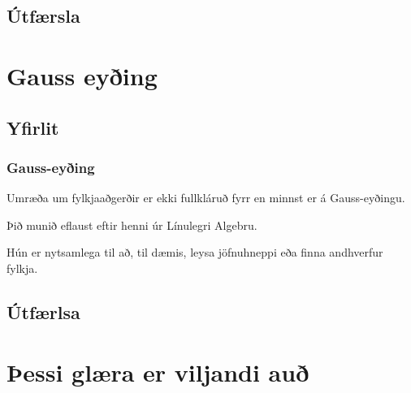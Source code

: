 \subsection{Útfærsla}
{
}

\section{Gauss eyðing}
\subsection{Yfirlit}
{
    \frametitle{Gauss-eyðing}
    {
        \item<1-> Umræða um fylkjaaðgerðir er ekki fullkláruð fyrr en minnst er á Gauss-eyðingu.
        \item<2-> Þið munið eflaust eftir henni úr Línulegri Algebru.
        \item<3-> Hún er nytsamlega til að, til dæmis, leysa jöfnuhneppi eða finna andhverfur fylkja.
    }
}

\subsection{Útfærlsa}
{
}

\section{Þessi glæra er viljandi auð}
{
}



